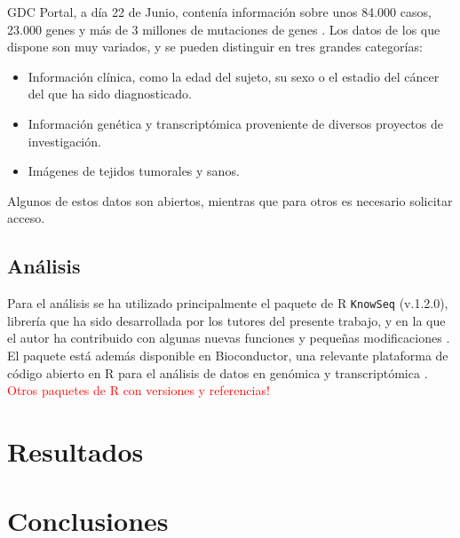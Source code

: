 GDC Portal, a día 22 de Junio, contenía información sobre unos 84.000 casos, 23.000 genes y más de 3 millones de mutaciones de genes \cite{GDCPortal}. Los datos de los que dispone son muy variados, y se pueden distinguir en tres grandes categorías:

\begin{itemize}
	\item Información clínica, como la edad del sujeto, su sexo o el estadio del cáncer del que ha sido diagnosticado.
	\item Información genética y transcriptómica proveniente de diversos proyectos de investigación.
	\item Imágenes de tejidos tumorales y sanos.
\end{itemize} 

Algunos de estos datos son abiertos, mientras que para otros es necesario solicitar acceso.

\subsection{Análisis}

Para el análisis se ha utilizado principalmente el paquete de R \texttt{KnowSeq} (v.1.2.0), librería que ha sido desarrollada por los tutores del presente trabajo, y en la que el autor ha contribuido con algunas nuevas funciones y pequeñas modificaciones \cite{KnowSeq}. El paquete está además disponible en Bioconductor, una relevante plataforma de código abierto en R para el análisis de datos en genómica y transcriptómica \cite{Gentleman2004}.\\

\textcolor{red}{Otros paquetes de R con versiones y referencias!}

\section{Resultados}

\section{Conclusiones}

